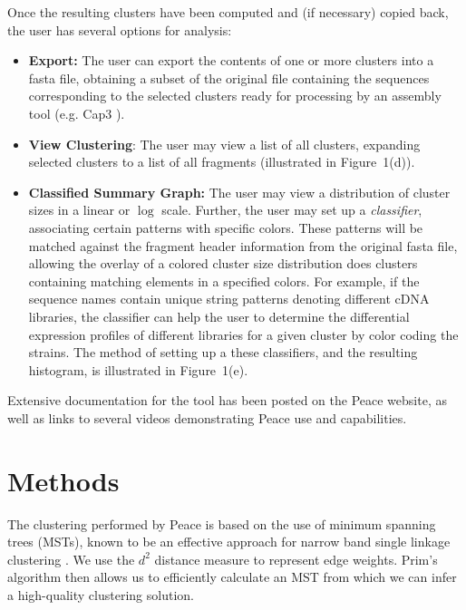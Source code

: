\documentclass[a4,center,fleqn]{NAR}
\begin{document}
 Once the resulting clusters have been
computed and (if necessary) copied back, the user has several options
for analysis:
\begin{itemize}
\item {\bf Export:} The user can export the contents of one or more
  clusters into a fasta file, obtaining a subset of the original file
  containing the sequences corresponding to the selected clusters
  ready for processing by an assembly tool (e.g. {\sc Cap3} \cite{Huang99}).
\item {\bf View Clustering}: The user may view a list of all clusters,
  expanding selected clusters to a list of all fragments (illustrated in
  Figure~1(d)).  
\item {\bf Classified Summary Graph:} The user may view a distribution
  of cluster sizes in a linear or $\log$ scale.  Further, the user may
  set up a {\it classifier}, associating certain patterns with
  specific colors.  These patterns will be matched against the
  fragment header information from the original fasta file, allowing
  the overlay of a colored cluster size distribution does clusters
  containing matching elements in a specified colors.  For example, if
  the sequence names contain unique string patterns denoting different
  cDNA libraries, the classifier can help the user to determine the
  differential expression profiles of different libraries for a given
  cluster by color coding the strains.  The method of setting up a
  these classifiers, and the resulting histogram, is illustrated in
  Figure~1(e).
\end{itemize}

Extensive documentation for the tool has been posted on the {\sc
  Peace} website, as well as links to several videos demonstrating
{\sc Peace} use and capabilities.


\section{Methods}

The clustering performed by {\sc Peace} is based on the use of minimum
spanning trees (MSTs), known to be an effective approach for narrow
band single linkage clustering \cite{Jain99,Wan08}. We use the $d^2$
distance measure \cite{Hide94} to represent edge weights.  Prim's
algorithm \cite{Prim57} then allows us to efficiently calculate an
MST from which we can infer a high-quality clustering solution.
\end{document}
